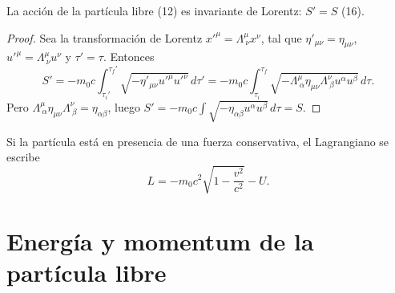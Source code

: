 \begin{proposicionc}
La acción de la partícula libre (12) es invariante de Lorentz:
$S'=S$ (16).
\end{proposicionc}

\begin{proof}
Sea la transformación de Lorentz $x'^\mu=\Lambda^\mu_{\ \nu}x^\nu$, tal
que $\eta'_{\mu\nu}=\eta_{\mu\nu}$, $u'^\mu=\Lambda^\mu_{\ \nu}u^\nu$ y
$\tau'=\tau$. Entonces
\[
S' = -m_0c\int_{\tau_i'}^{\tau_f'}\sqrt{-\eta'_{\mu\nu}u'^\mu u'^\nu}\,
d\tau' = -m_0c\int_{\tau_i}^{\tau_f}\sqrt{-\Lambda^\mu_{\ \alpha}\eta_{\mu
\nu}\Lambda^\nu_{\ \beta}u^\alpha u^\beta}\,d\tau .
\]
Pero $\Lambda^\mu_{\ \alpha}\eta_{\mu\nu}\Lambda^\nu_{\ \beta}=
\eta_{\alpha\beta}$, luego $S'=-m_0c\int\sqrt{-\eta_{\alpha\beta}
u^\alpha u^\beta}\,d\tau=S$. \qedhere
\end{proof}

Si la partícula está en presencia de una fuerza conservativa, el
Lagrangiano se escribe
\[
L = -m_0c^2\sqrt{1-\frac{v^2}{c^2}}-U . \tag{17}
\]

\section{Energía y momentum de la partícula libre}

